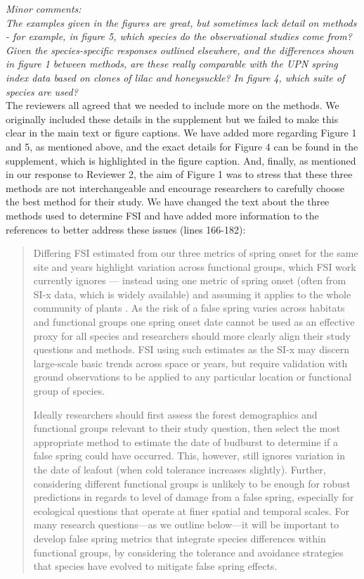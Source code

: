 \documentclass[11pt,a4paper]{article}
\begin{document}
\textit{Minor comments: \\
The examples given in the figures are great, but sometimes lack detail on methods - for example, in figure 5, which species do the observational studies come from?  Given the species-specific responses outlined elsewhere, and the differences shown in figure 1 between methods, are these really comparable with the UPN spring index data based on clones of lilac and honeysuckle?
In figure 4, which suite of species are used?} \\

The reviewers all agreed that we needed to include more on the methods. We originally included these details in the supplement but we failed to make this clear in the main text or figure captions. We have added more regarding Figure 1 and 5, as mentioned above, and the exact details for Figure 4 can be found in the supplement, which is highlighted in the figure caption. And, finally, as mentioned in our response to Reviewer 2, the aim of Figure 1 was to stress that these three methods are not interchangeable and encourage researchers to carefully choose the best method for their study. We have changed the text about the three methods used to determine FSI and have added more information to the references to better address these issues (lines 166-182): 

\begin{quotation}
Differing FSI estimated from our three metrics of spring onset for the same site and years highlight variation across functional groups, which FSI work currently ignores --- instead using one metric of spring onset (often from SI-x data, which is widely available) and assuming it applies to the whole community of plants \citep{Allstadt2015, Marino2011, Mehdipoor2017, Peterson2014}. As the risk of a false spring varies across habitats and functional groups \citep{Martin2010} one spring onset date cannot be used as an effective proxy for all species and researchers should more clearly align their study questions and methods. FSI using such estimates as the SI-x may discern large-scale basic trends across space or years, but require validation with ground observations to be applied to any particular location or functional group of species. 

Ideally researchers should first assess the forest demographics and functional groups relevant to their study question, then select the most appropriate method to estimate the date of budburst to determine if a false spring could have occurred. This, however, still ignores variation in the date of leafout (when cold tolerance increases slightly). Further, considering different functional groups is unlikely to be enough for robust predictions in regards to level of damage from a false spring, especially for ecological questions that operate at finer spatial and temporal scales. For many research questions---as we outline below---it will be important to develop false spring metrics that integrate species differences within functional groups, by considering the tolerance and avoidance strategies that species have evolved to mitigate false spring effects.
\end{quotation}




\newpage

\end{document}
